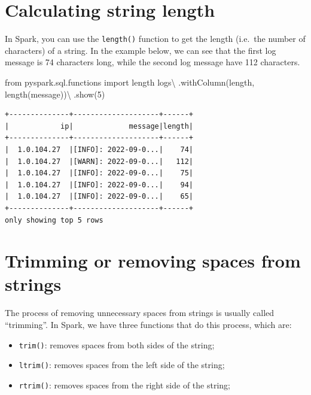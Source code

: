 \documentclass[
  11pt,
  letterpaper,
  DIV=11,
  numbers=noendperiod]{scrreprt}
\newenvironment{Shaded}{\begin{snugshade}}{\end{snugshade}}
\newcommand{\DecValTok}[1]{\textcolor[rgb]{0.68,0.00,0.00}{#1}}
\newcommand{\ImportTok}[1]{\textcolor[rgb]{0.00,0.46,0.62}{#1}}
\newcommand{\NormalTok}[1]{\textcolor[rgb]{0.00,0.23,0.31}{#1}}
\newcommand{\OperatorTok}[1]{\textcolor[rgb]{0.37,0.37,0.37}{#1}}
\newcommand{\StringTok}[1]{\textcolor[rgb]{0.13,0.47,0.30}{#1}}
\providecommand{\tightlist}{%
  \setlength{\itemsep}{0pt}\setlength{\parskip}{0pt}}\usepackage{longtable,booktabs,array}
\begin{document}
\hypertarget{calculating-string-length}{%
\section{Calculating string length}\label{calculating-string-length}}

In Spark, you can use the \texttt{length()} function to get the length
(i.e.~the number of characters) of a string. In the example below, we
can see that the first log message is 74 characters long, while the
second log message have 112 characters.

\begin{Shaded}
\begin{Highlighting}[]
\ImportTok{from}\NormalTok{ pyspark.sql.functions }\ImportTok{import}\NormalTok{ length}
\NormalTok{logs}\OperatorTok{\textbackslash{}}
\NormalTok{    .withColumn(}\StringTok{\textquotesingle{}length\textquotesingle{}}\NormalTok{, length(}\StringTok{\textquotesingle{}message\textquotesingle{}}\NormalTok{))}\OperatorTok{\textbackslash{}}
\NormalTok{    .show(}\DecValTok{5}\NormalTok{)}
\end{Highlighting}
\end{Shaded}

\begin{verbatim}
+--------------+--------------------+------+
|            ip|             message|length|
+--------------+--------------------+------+
|  1.0.104.27  |[INFO]: 2022-09-0...|    74|
|  1.0.104.27  |[WARN]: 2022-09-0...|   112|
|  1.0.104.27  |[INFO]: 2022-09-0...|    75|
|  1.0.104.27  |[INFO]: 2022-09-0...|    94|
|  1.0.104.27  |[INFO]: 2022-09-0...|    65|
+--------------+--------------------+------+
only showing top 5 rows
\end{verbatim}

\hypertarget{trimming-or-removing-spaces-from-strings}{%
\section{Trimming or removing spaces from
strings}\label{trimming-or-removing-spaces-from-strings}}

The process of removing unnecessary spaces from strings is usually
called ``trimming''. In Spark, we have three functions that do this
process, which are:

\begin{itemize}
\tightlist
\item
  \texttt{trim()}: removes spaces from both sides of the string;
\item
  \texttt{ltrim()}: removes spaces from the left side of the string;
\item
  \texttt{rtrim()}: removes spaces from the right side of the string;
\end{itemize}
\end{document}
